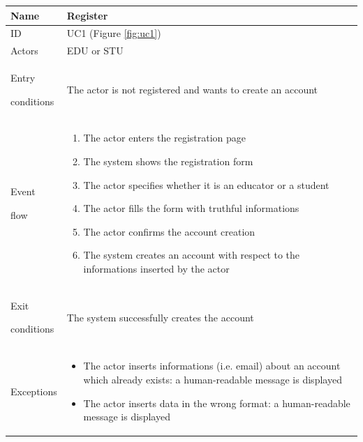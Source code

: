 \begin{center}
    \def\arraystretch{1.5}
    \begin{tabular}{| m{2cm} | m{10cm}|}
        \hline
        Name                  & Register                                                                                                                      \\ \hline
        ID                    & UC1 (Figure \ref{fig:uc1})                                                                                                    \\ \hline
        Actors                & EDU or STU                                                                                                                    \\ \hline
        Entry \par conditions & The actor is not registered and wants to create an account                                                                    \\ \hline
        Event \par flow       & \begin{enumerate}
                                    \item The actor enters the registration page
                                    \item The system shows the registration form
                                    \item The actor specifies whether it is an educator or a student
                                    \item The actor fills the form with truthful informations
                                    \item The actor confirms the account creation
                                    \item The system creates an account with respect to the informations inserted by the actor
                                \end{enumerate}                                     \\ \hline
        Exit \par conditions  & The system successfully creates the account                                                                                   \\ \hline
        Exceptions            & \begin{itemize}
                                    \item The actor inserts informations (i.e. email) about an account which already exists: a human-readable message is displayed
                                    \item The actor inserts data in the wrong format: a human-readable message is displayed
                                \end{itemize} \\ \hline
    \end{tabular}
\end{center}

